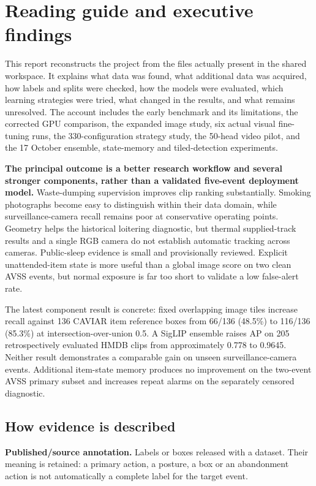 \chapter*{Reading guide and executive findings}

This report reconstructs the project from the files actually present in the shared workspace. It explains what data was found, what additional data was acquired, how labels and splits were checked, how the models were evaluated, which learning strategies were tried, what changed in the results, and what remains unresolved. The account includes the early benchmark and its limitations, the corrected GPU comparison, the expanded image study, six actual visual fine-tuning runs, the 330-configuration strategy study, the 50-head video pilot, and the 17 October ensemble, state-memory and tiled-detection experiments.

\textbf{The principal outcome is a better research workflow and several stronger components, rather than a validated five-event deployment model.} Waste-dumping supervision improves clip ranking substantially. Smoking photographs become easy to distinguish within their data domain, while surveillance-camera recall remains poor at conservative operating points. Geometry helps the historical loitering diagnostic, but thermal supplied-track results and a single RGB camera do not establish automatic tracking across cameras. Public-sleep evidence is small and provisionally reviewed. Explicit unattended-item state is more useful than a global image score on two clean AVSS events, but normal exposure is far too short to validate a low false-alert rate.

The latest component result is concrete: fixed overlapping image tiles increase recall against 136 CAVIAR item reference boxes from 66/136 (48.5\%) to 116/136 (85.3\%) at intersection-over-union 0.5. A SigLIP ensemble raises AP on 205 retrospectively evaluated HMDB clips from approximately 0.778 to 0.9645. Neither result demonstrates a comparable gain on unseen surveillance-camera events. Additional item-state memory produces no improvement on the two-event AVSS primary subset and increases repeat alarms on the separately censored diagnostic.

\section*{How evidence is described}
\textbf{Published/source annotation.} Labels or boxes released with a dataset. Their meaning is retained: a primary action, a posture, a box or an abandonment action is not automatically a complete label for the target event.

